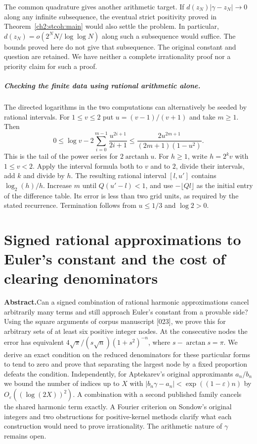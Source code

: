 \documentclass[11pt,a4paper,oneside,openany]{report}
\theoremstyle{remark}\newtheorem{remark}[theorem]{Remark}
\numberwithin{equation}{section}
\begin{document}
The common quadrature gives another arithmetic target. If $d(z_N)|\gamma-z_N|\to0$ along any infinite subsequence, the eventual strict positivity proved in Theorem~\ref{ch2:stcoh:main} would also settle the problem. In particular, $d(z_N)=o(2^NN/\log\log N)$ along such a subsequence would suffice. The bounds proved here do not give that subsequence. The original constant and question are retained. We have neither a complete irrationality proof nor a priority claim for such a proof.
\paragraph{Checking the finite data using rational arithmetic alone.}
The directed logarithms in the two computations can alternatively be seeded by rational intervals. For $1\le v\le2$ put $u=(v-1)/(v+1)$ and take $m\ge1$. Then
\[
 0\le\log v-2\sum_{i=0}^{m-1}\frac{u^{2i+1}}{2i+1}
 \le \frac{2u^{2m+1}}{(2m+1)(1-u^2)} .
\]
This is the tail of the power series for $2\operatorname{arctanh}u$. For $h\ge1$, write $h=2^k v$ with $1\le v<2$. Apply the interval formula both to $v$ and to $2$, divide their intervals, add $k$ and divide by $h$. The resulting rational interval $[l,u']$ contains $\log_2(h)/h$. Increase $m$ until $Q(u'-l)<1$, and use $-\lfloor Ql\rfloor$ as the initial entry of the difference table. Its error is less than two grid units, as required by the stated recurrence. Termination follows from $u\le1/3$ and $\log2>0$.

\chapter[Signed rational approximations and reduced denominators]{Signed rational approximations to Euler's constant and the cost of clearing denominators}\label{chap:3}
\noindent\textbf{Abstract.}\enspace Can a signed combination of rational harmonic approximations cancel arbitrarily many terms and still approach Euler's constant from a provable side? Using the square arguments of corpus manuscript [023], we prove this for arbitrary sets of at least six positive integer nodes. At the consecutive nodes the error has equivalent $4\sqrt{\pi}/(s\sqrt n)(1+s^2)^{-n}$, where $s-\arctan s=\pi$. We derive an exact condition on the reduced denominators for these particular forms to tend to zero and prove that separating the largest node by a fixed proportion defeats the condition. Independently, for Aptekarev's original approximants $a_n/b_n$ we bound the number of indices up to $X$ with $|b_n\gamma-a_n|<\exp((1-\varepsilon)n)$ by $O_\varepsilon((\log(2X))^2)$. A combination with a second published family cancels the shared harmonic term exactly. A Fourier criterion on Sondow's original integers and two obstructions for positive-kernel methods clarify what each construction would need to prove irrationality. The arithmetic nature of $\gamma$ remains open.
\end{document}
